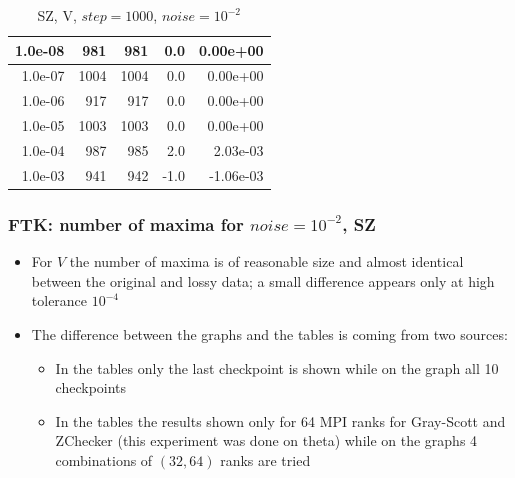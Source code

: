 \begin{frame}[fragile]
{\begin{table}[H]
\begin{tabular}{|r|r|r|r|r|}
  1.0e-08 &              981 &           981 &             0.0 &       0.00e+00 \\
\hline
  1.0e-07 &             1004 &          1004 &             0.0 &       0.00e+00 \\
\hline
  1.0e-06 &              917 &           917 &             0.0 &       0.00e+00 \\
\hline
  1.0e-05 &             1003 &          1003 &             0.0 &       0.00e+00 \\
\hline
  1.0e-04 &              987 &           985 &             2.0 &       2.03e-03 \\
\hline
  1.0e-03 &              941 &           942 &            -1.0 &      -1.06e-03 \\
\hline
\end{tabular}
\caption{SZ, V, $step = 1000$, $noise = 10^{-2}$}
\label{sz_v_table}
\end{table}
}

  
\end{frame}


\begin{frame}[fragile]
  \frametitle{FTK: number of maxima for $noise = 10^{-2}$, SZ }

  \begin{itemize}
  \item For $V$ the number of maxima is of reasonable size and almost identical between the original
    and lossy data; a small difference appears only at high tolerance $10^{-4}$
  \item The difference between the graphs and the tables is coming from two sources:
    \begin{itemize}
    \item In the tables only the last checkpoint is shown while on the graph all 10 checkpoints
    \item In the tables the results shown only for 64 MPI ranks for Gray-Scott and ZChecker (this experiment was done on theta)
      while on the graphs 4 combinations of $(32, 64)$ ranks are tried
    \end{itemize}
  \end{itemize}
\end{frame}

